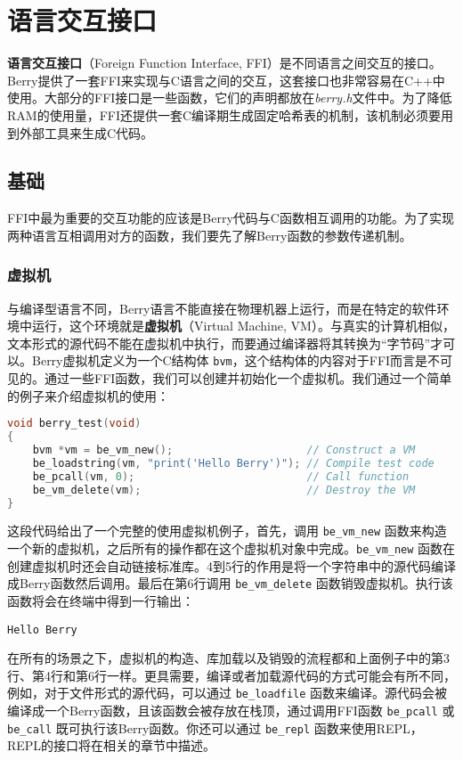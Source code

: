 \chapter{语言交互接口}

\textbf{语言交互接口}（Foreign Function Interface, FFI）是不同语言之间交互的接口。Berry提供了一套FFI来实现与C语言之间的交互，这套接口也非常容易在C++中使用。大部分的FFI接口是一些函数，它们的声明都放在\textsl{berry.h}文件中。为了降低RAM的使用量，FFI还提供一套C编译期生成固定哈希表的机制，该机制必须要用到外部工具来生成C代码。

\section{基础}

FFI中最为重要的交互功能的应该是Berry代码与C函数相互调用的功能。为了实现两种语言互相调用对方的函数，我们要先了解Berry函数的参数传递机制。

\subsection{虚拟机}

与编译型语言不同，Berry语言不能直接在物理机器上运行，而是在特定的软件环境中运行，这个环境就是\textbf{虚拟机}（Virtual Machine, VM）。与真实的计算机相似，文本形式的源代码不能在虚拟机中执行，而要通过编译器将其转换为“字节码”才可以。Berry虚拟机定义为一个C结构体 \texttt{bvm}，这个结构体的内容对于FFI而言是不可见的。通过一些FFI函数，我们可以创建并初始化一个虚拟机。我们通过一个简单的例子来介绍虚拟机的使用：
\begin{lstlisting}[language=c, style=berry]
void berry_test(void)
{
    bvm *vm = be_vm_new();                     // Construct a VM
    be_loadstring(vm, "print('Hello Berry')"); // Compile test code
    be_pcall(vm, 0);                           // Call function
    be_vm_delete(vm);                          // Destroy the VM
}
\end{lstlisting}
这段代码给出了一个完整的使用虚拟机例子，首先，调用 \texttt{be\_vm\_new} 函数来构造一个新的虚拟机，之后所有的操作都在这个虚拟机对象中完成。\texttt{be\_vm\_new} 函数在创建虚拟机时还会自动链接标准库。4到5行的作用是将一个字符串中的源代码编译成Berry函数然后调用。最后在第6行调用 \texttt{be\_vm\_delete} 函数销毁虚拟机。执行该函数将会在终端中得到一行输出：
\begin{lstlisting}[numbers=none]
Hello Berry
\end{lstlisting}

在所有的场景之下，虚拟机的构造、库加载以及销毁的流程都和上面例子中的第3行、第4行和第6行一样。更具需要，编译或者加载源代码的方式可能会有所不同，例如，对于文件形式的源代码，可以通过 \texttt{be\_loadfile} 函数来编译。源代码会被编译成一个Berry函数，且该函数会被存放在栈顶，通过调用FFI函数 \texttt{be\_pcall} 或 \texttt{be\_call} 既可执行该Berry函数。你还可以通过 \texttt{be\_repl} 函数来使用REPL，REPL的接口将在相关的章节中描述。

